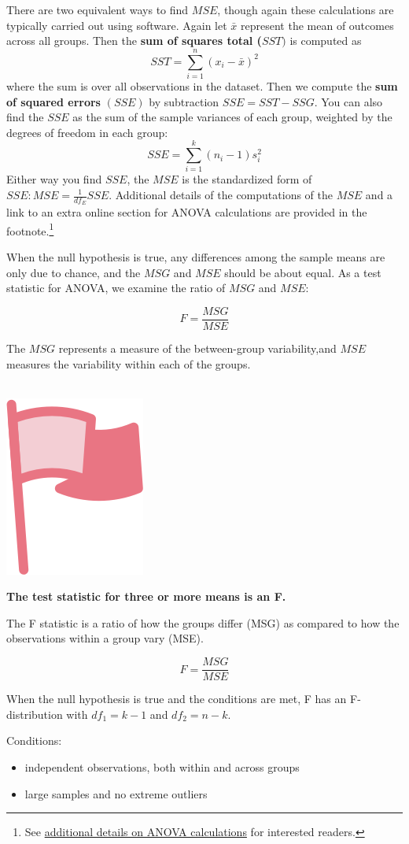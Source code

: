 \documentclass[
  10pt,
  openany]{book}
\providecommand{\tightlist}{%
  \setlength{\itemsep}{0pt}\setlength{\parskip}{0pt}}
\newenvironment{mdframedwithfootImportant}
{   
    \savenotes
    \begin{mdframed}[%
    topline=true, bottomline=true, linecolor=oiR, linewidth=0.5pt,
    rightline=false, leftline=false,
    backgroundcolor=oiLGray]
    \renewcommand{\thempfootnote}{\arabic{footnote}}
    }
{
    \end{mdframed}
    \spewnotes
}
\newenvironment{important}{
    \let\oldtextbf\textbf
    \renewcommand{\textbf}[1]{{\textcolor{oiR}{\oldtextbf{##1}}}}
\vspace{4mm}
\begin{mdframedwithfootImportant}
\begin{minipage}[t]{0.10\textwidth}
{$\:$ \\ \setkeys{Gin}{width=2.5em,keepaspectratio}\includegraphics{images/_icons/important.png}}
\end{minipage}
\hfill
\begin{minipage}[t]{0.90\textwidth}
\vspace{-2mm}
\setlength{\parskip}{1em}
}{\end{minipage}
\end{mdframedwithfootImportant}
\vspace{4mm}
}
\begin{document}
There are two equivalent ways to find \(MSE\), though again these calculations are typically carried out using software. Again let \(\bar{x}\) represent the mean of outcomes across all groups. Then the \textbf{sum of squares total (}\(SST)\) is computed as
\[
SST = \sum_{i=1}^{n} \left(x_{i} - \bar{x}\right)^2
\]
where the sum is over all observations in the dataset. Then we compute the \textbf{sum of squared errors} \((SSE)\) by subtraction \(SSE = SST - SSG\). You can also find the \(SSE\) as the sum of the sample variances of each group, weighted by the degrees of freedom in each group:
\[
SSE = \sum_{i=1}^{k} (n_i - 1) s_i^2
\]
Either way you find \(SSE\), the \(MSE\) is the standardized form of \(SSE: MSE = \frac{1}{df_{E}}SSE.\) Additional details of the computations of the \(MSE\) and a link to an extra online section for ANOVA calculations are provided in the footnote.\footnote{See \href{https://www.openintro.org/download.php?file=stat_extra_anova_calculations}{additional details on ANOVA calculations} for interested readers.}

When the null hypothesis is true, any differences among the sample means are only due to chance, and the \(MSG\) and \(MSE\) should be about equal.
As a test statistic for ANOVA, we examine the ratio of \(MSG\) and \(MSE:\)

\[F = \frac{MSG}{MSE}\]

The \(MSG\) represents a measure of the between-group variability,and \(MSE\) measures the variability within each of the groups.

\begin{important}

\textbf{The test statistic for three or more means is an F.}

The F statistic is a ratio of how the groups differ (MSG) as compared to how the observations within a group vary (MSE).

\[F = \frac{MSG}{MSE}\]

When the null hypothesis is true and the conditions are met, F has an F-distribution with \(df_1 = k-1\) and \(df_2 = n-k.\)

Conditions:

\begin{itemize}
\tightlist
\item
  independent observations, both within and across groups\\
\item
  large samples and no extreme outliers\\
\end{itemize}

\end{important}
\end{document}
